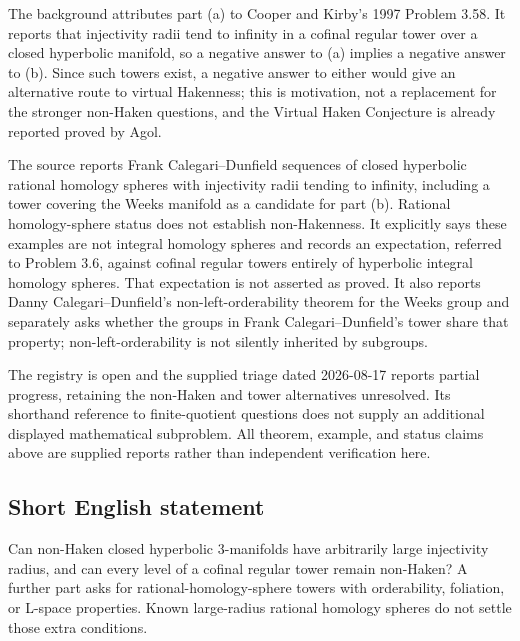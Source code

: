 \documentclass[11pt]{article}
\begin{document}
The background attributes part (a) to Cooper and Kirby's 1997 Problem 3.58. It reports that injectivity radii tend to infinity in a cofinal regular tower over a closed hyperbolic manifold, so a negative answer to (a) implies a negative answer to (b). Since such towers exist, a negative answer to either would give an alternative route to virtual Hakenness; this is motivation, not a replacement for the stronger non-Haken questions, and the Virtual Haken Conjecture is already reported proved by Agol.

The source reports Frank Calegari--Dunfield sequences of closed hyperbolic rational homology spheres with injectivity radii tending to infinity, including a tower covering the Weeks manifold as a candidate for part (b). Rational homology-sphere status does not establish non-Hakenness. It explicitly says these examples are not integral homology spheres and records an expectation, referred to Problem 3.6, against cofinal regular towers entirely of hyperbolic integral homology spheres. That expectation is not asserted as proved. It also reports Danny Calegari--Dunfield's non-left-orderability theorem for the Weeks group and separately asks whether the groups in Frank Calegari--Dunfield's tower share that property; non-left-orderability is not silently inherited by subgroups.

The registry is open and the supplied triage dated 2026-08-17 reports partial progress, retaining the non-Haken and tower alternatives unresolved. Its shorthand reference to finite-quotient questions does not supply an additional displayed mathematical subproblem. All theorem, example, and status claims above are supplied reports rather than independent verification here.
\subsection{Short English statement}
Can non-Haken closed hyperbolic $3$-manifolds have arbitrarily large injectivity radius, and can every level of a cofinal regular tower remain non-Haken? A further part asks for rational-homology-sphere towers with orderability, foliation, or L-space properties. Known large-radius rational homology spheres do not settle those extra conditions.
\end{document}
